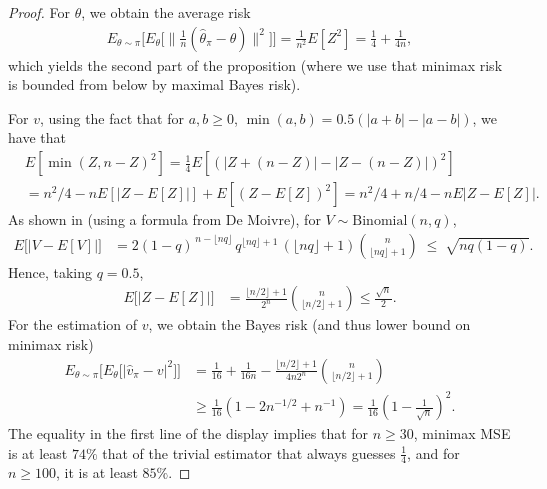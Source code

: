 \documentclass[12pt,reqno]{amsart}
\theoremstyle{theorem}
\theoremstyle{definition}
\newcommand{\0}{\mathbf{0}}
\newcommand{\1}{\mathbf{1}}
\begin{document}
\begin{proof}
    For $\theta$, we obtain the average risk
    \begin{align*}
        E_{\theta \sim \pi} \bigg[E_\theta \bigg[\bigg\| \tfrac{1}{n} (\hat{\theta}_\pi - \theta) \bigg\|^2\bigg]\bigg]
        = \frac{1}{n^2} E[Z^2]
        = \frac{1}{4} + \frac{1}{4 n},
    \end{align*}
    which yields the second part of the proposition (where we use that minimax risk is bounded from below by maximal Bayes risk).

    For $v$, using the fact that for $a,b \geq 0$, $\min(a,b) = 0.5 (|a+b| - |a-b|)$, we have that    
    \begin{align*}
        &E[\min(Z, n - Z)^2]
        =
        \frac{1}{4}
        E \left[\left(|Z + (n - Z)| - |Z - (n - Z)| \right)^2 \right]
        \\
        &= n^2 / 4  - n E [|Z - E[Z]|] + E[(Z - E[Z])^2]
        =
        n^2 / 4 + n / 4 - n E |Z - E[Z]|.
    \end{align*}
    As shown in \citet{berend2013sharp} (using a formula from De Moivre), for
    $V \sim \text{Binomial}(n,q)$,
    \begin{align*}
        E\big[\left|V-E[V]\right|\big]
        &=2(1-q)^{\,n-\lfloor nq\rfloor}\,q^{\lfloor nq\rfloor+1}\,(\lfloor nq\rfloor+1)
        \binom{n}{\lfloor nq\rfloor+1}
        \;\le\; \sqrt{nq(1-q)}.
    \end{align*}
    Hence, taking $q=0.5$,
    \begin{align*}
        E\big[\bigl|Z - E[Z]\bigr|\big]
        &=
        \frac{\lfloor n/2\rfloor+1}{2^{n}} \binom{n}{\lfloor n/2\rfloor+1}
        \le
        \frac{\sqrt{n}}{2}.
    \end{align*}
    For the estimation of $v$, we obtain the Bayes risk (and thus lower bound on minimax risk)
    \begin{align*}
        E_{\theta \sim \pi}\big[ E_\theta \big[ | \hat{v}_\pi - v |^2 \big]\big]
        &=
        \frac{1}{16}
        + \frac{1}{16 n}
        - \frac{\lfloor n/2\rfloor+1}{4 n 2^{n}} \binom{n}{\lfloor n/2\rfloor+1}
        \\
        &\geq
        \frac{1}{16} \left(1 - 2 n^{-1/2} + n^{-1}\right)
        = \frac{1}{16} \left(1 - \frac{1}{\sqrt{n}}\right)^2.
    \end{align*}
    The equality in the first line of the display implies that for $n\ge 30$, minimax MSE is at least $74\%$ that of the
    trivial estimator that always guesses $\tfrac{1}{4}$, and for $n\ge 100$, it is at least $85\%$.
\end{proof}
\end{document}
